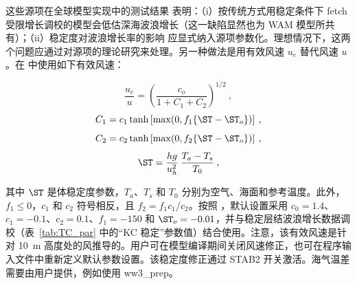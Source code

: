 这些源项在全球模型实现中的测试结果 \citep{tol:OMB02a} 表明：（i）按传统方式用稳定条件下 fetch 受限增长调校的模型会低估深海波浪增长（这一缺陷显然也为 WAM 模型所共有）；（ii）稳定度对波浪增长率的影响 \citep{art:KC92,ibk:KC94} 应显式纳入源项参数化。理想情况下，这两个问题应通过对源项的理论研究来处理。另一种做法是用有效风速 $u_e$ 替代风速 $u$。在 \cite{tol:OMB02a} 中使用如下有效风速：


\begin{equation}
\frac{u_e}{u} = \left ( \frac{c_o}{1 + C_1 + C_2} \right )^{1/2}
\: , \label{eq:scor} \end{equation} \begin{equation}
C_1 = c_1 \tanh \left [ \max ( 0 , f_1 \{ \ST - \ST_o \} ) \right ]
\: , \label{eq:c1} \end{equation} \begin{equation}
C_2 = c_2 \tanh \left [ \max ( 0 , f_2 \{ \ST - \ST_o \} ) \right ]
\: , \label{eq:c2} \end{equation} \begin{equation}
\ST = \frac{h g}{u_h^2} \: \frac{T_a - T_s}{T_0}
\: , \label{eq:stab} \end{equation}

\noindent
其中 $\ST$ 是体稳定度参数，$T_a$、$T_s$ 和 $T_0$ 分别为空气、海面和参考温度。此外，$f_1 \leq 0$，$c_1$ 和 $c_2$ 符号相反，且 $f_2 = f_1 c_1 / c_2$。按照 \cite{tol:OMB02a}，默认设置采用 $c_0 = 1.4$、$c_1 = -0.1$、$c_2 = 0.1$、$f_1 = -150$ 和 $\ST_o = -0.01$，并与稳定层结波浪增长数据调校（表~\ref{tab:TC_par} 中的“KC 稳定”参数值）结合使用。注意，该有效风速是针对 10~m 高度处的风推导的。用户可在模型编译期间关闭风速修正，也可在程序输入文件中重新定义默认参数设置。该稳定度修正通过 {\code STAB2} 开关激活。海气温差需要由用户提供，例如使用 {\file ww3\_prep}。
